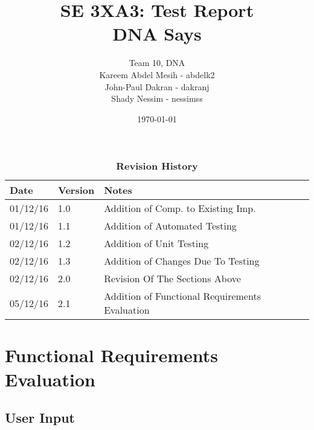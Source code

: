 \documentclass[12pt, titlepage]{article}
\title{SE 3XA3: Test Report\\DNA Says}
\author{Team 10, DNA
		\\ Kareem Abdel Mesih - abdelk2
		\\ John-Paul Dakran - dakranj
		\\ Shady Nessim - nessimss
}
\date{\today}
\begin{document}
\maketitle

\tableofcontents
\listoftables
\listoffigures

\begin{table}[h]
\caption{\bf Revision History}
\begin{tabularx}{\textwidth}{p{3cm}p{2cm}X}
\toprule {\bf Date} & {\bf Version} & {\bf Notes}\\
\midrule
01/12/16 & 1.0 & Addition of Comp. to Existing Imp.\\
01/12/16 & 1.1 & Addition of Automated Testing\\
02/12/16 & 1.2 & Addition of  Unit Testing\\
02/12/16 & 1.3 & Addition of Changes Due To Testing\\
02/12/16 & 2.0 & Revision Of The Sections Above\\
05/12/16 & 2.1 & Addition of Functional Requirements Evaluation\\
\bottomrule
\end{tabularx}
\end{table}

\newpage


\section{Functional Requirements Evaluation}

\subsection{User Input}
\end{document}
